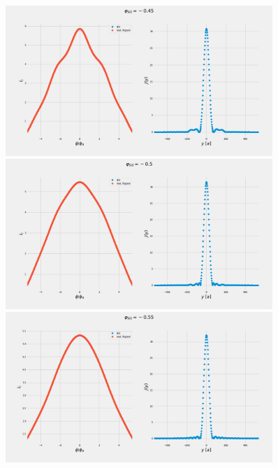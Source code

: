 \documentclass[a4paper]{article}
\begin{document}
\begin{figure}
	\includegraphics[width=0.9\textwidth]{figs/wg32/current_and_density_045}
	\includegraphics[width=0.9\textwidth]{figs/wg32/current_and_density_05}
	\includegraphics[width=0.9\textwidth]{figs/wg32/current_and_density_055}
\end{figure}
\end{document}
